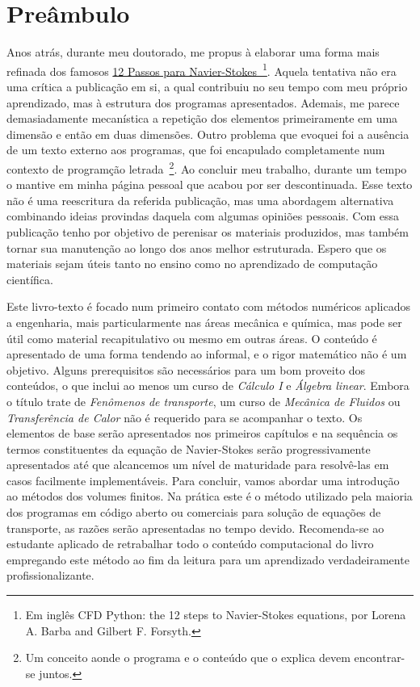 \chapter*{Preâmbulo}%
%

Anos atrás, durante meu doutorado, me propus à elaborar uma forma mais refinada dos famosos \href{https://jose.theoj.org/papers/10.21105/jose.00021}{12 Passos para Navier-Stokes~\footnote{Em inglês CFD Python: the 12 steps to Navier-Stokes equations, por Lorena A. Barba and Gilbert F. Forsyth.}}. Aquela tentativa não era uma crítica a publicação em si, a qual contribuiu no seu tempo com meu próprio aprendizado, mas à estrutura dos programas apresentados. Ademais, me parece demasiadamente mecanística a repetição dos elementos primeiramente em uma dimensão e então em duas dimensões. Outro problema que evoquei foi a ausência de um texto externo aos programas, que foi encapulado completamente num contexto de programção letrada~\footnote{Um conceito aonde o programa e o conteúdo que o explica devem encontrar-se juntos.}. Ao concluir meu trabalho, durante um tempo o mantive em minha página pessoal que acabou por ser descontinuada. Esse texto não é uma reescritura da referida publicação, mas uma abordagem alternativa combinando ideias provindas daquela com algumas opiniões pessoais. Com essa publicação tenho por objetivo de perenisar os materiais produzidos, mas também tornar sua manutenção ao longo dos anos melhor estruturada. Espero que os materiais sejam úteis tanto no ensino como no aprendizado de computação científica.

Este livro-texto é focado num primeiro contato com métodos numéricos aplicados a engenharia, mais particularmente nas áreas mecânica e química, mas pode ser útil como material recapitulativo ou mesmo em outras áreas. O conteúdo é apresentado de uma forma tendendo ao informal, e o rigor matemático não é um objetivo. Alguns prerequisitos são necessários para um bom proveito dos conteúdos, o que inclui ao menos um curso de \emph{Cálculo I} e \emph{Álgebra linear}. Embora o título trate de \emph{Fenômenos de transporte}, um curso de \emph{Mecânica de Fluidos} ou \emph{Transferência de Calor} não é requerido para se acompanhar o texto. Os elementos de base serão apresentados nos primeiros capítulos e na sequência os termos constituentes da equação de Navier-Stokes serão progressivamente apresentados até que alcancemos um nível de maturidade para resolvê-las em casos facilmente implementáveis. Para concluir, vamos abordar uma introdução ao métodos dos volumes finitos. Na prática este é o método utilizado pela maioria dos programas em código aberto ou comerciais para solução de equações de transporte, as razões serão apresentadas no tempo devido. Recomenda-se ao estudante aplicado de retrabalhar todo o conteúdo computacional do livro empregando este método ao fim da leitura para um aprendizado verdadeiramente profissionalizante.


